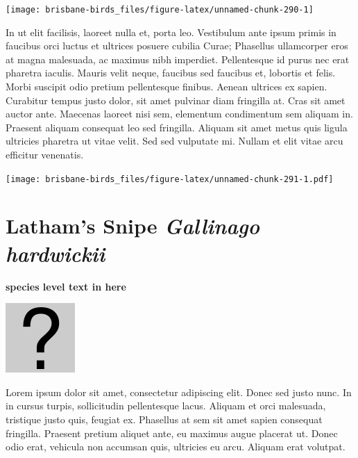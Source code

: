 \documentclass[]{book}
\let\origfigure\figure
\let\endorigfigure\endfigure
\renewenvironment{figure}[1][2] {
  \expandafter\origfigure\expandafter[H]
} {
  \endorigfigure
}
\begin{document}
\begin{figure}
\texttt{[image: brisbane-birds\_files/figure-latex/unnamed-chunk-290-1]} \caption{insert figure caption}\label{fig:unnamed-chunk-290}
\end{figure}

In ut elit facilisis, laoreet nulla et, porta leo. Vestibulum ante ipsum
primis in faucibus orci luctus et ultrices posuere cubilia Curae;
Phasellus ullamcorper eros at magna malesuada, ac maximus nibh
imperdiet. Pellentesque id purus nec erat pharetra iaculis. Mauris velit
neque, faucibus sed faucibus et, lobortis et felis. Morbi suscipit odio
pretium pellentesque finibus. Aenean ultrices ex sapien. Curabitur
tempus justo dolor, sit amet pulvinar diam fringilla at. Cras sit amet
auctor ante. Maecenas laoreet nisi sem, elementum condimentum sem
aliquam in. Praesent aliquam consequat leo sed fringilla. Aliquam sit
amet metus quis ligula ultricies pharetra ut vitae velit. Sed sed
vulputate mi. Nullam et elit vitae arcu efficitur venenatis.

\begin{figure}
\centering
\texttt{[image: brisbane-birds\_files/figure-latex/unnamed-chunk-291-1.pdf]}
\caption{\label{fig:unnamed-chunk-291}insert figure caption}
\end{figure}

\section{\texorpdfstring{Latham's Snipe \emph{Gallinago
hardwickii}}{Latham's Snipe Gallinago hardwickii}}\label{lathams-snipe-gallinago-hardwickii}

\textbf{species level text in here}

\begin{figure}
\centering
\includegraphics{assets/missing.png}
\caption{No image for species}
\end{figure}

Lorem ipsum dolor sit amet, consectetur adipiscing elit. Donec sed justo
nunc. In in cursus turpis, sollicitudin pellentesque lacus. Aliquam et
orci malesuada, tristique justo quis, feugiat ex. Phasellus at sem sit
amet sapien consequat fringilla. Praesent pretium aliquet ante, eu
maximus augue placerat ut. Donec odio erat, vehicula non accumsan quis,
ultricies eu arcu. Aliquam erat volutpat.
\end{document}
